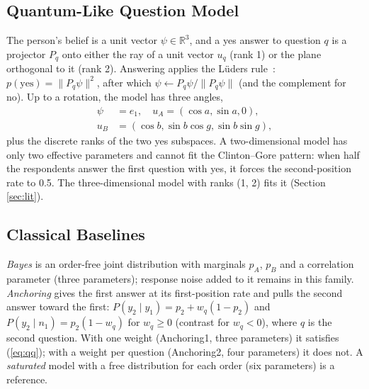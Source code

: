 \subsection{Quantum-Like Question Model}\label{sec:ql}
The person's belief is a unit vector $\psi\in\mathbb{R}^3$, and a yes answer to question $q$ is a projector $P_q$ onto either the ray of a unit vector $u_q$ (rank 1) or the plane orthogonal to it (rank 2). Answering applies the L\"uders rule~\cite{Busemeyer2012}: $p(\text{yes})=\|P_q\psi\|^2$, after which $\psi\leftarrow P_q\psi/\|P_q\psi\|$ (and the complement for no). Up to a rotation, the model has three angles,
\begin{equation}
\begin{aligned}
\psi&=e_1,\quad u_A=(\cos a,\sin a,0),\\
u_B&=(\cos b,\sin b\cos g,\sin b\sin g),
\end{aligned}
\end{equation}
plus the discrete ranks of the two yes subspaces. A two-dimensional model has only two effective parameters and cannot fit the Clinton--Gore pattern: when half the respondents answer the first question with yes, it forces the second-position rate to 0.5. The three-dimensional model with ranks (1, 2) fits it (Section \ref{sec:lit}).

\subsection{Classical Baselines}\label{sec:classical}
\textit{Bayes} is an order-free joint distribution with marginals $p_A$, $p_B$ and a correlation parameter (three parameters); response noise added to it remains in this family. \textit{Anchoring} gives the first answer at its first-position rate and pulls the second answer toward the first: $P(y_2\mid y_1)=p_2+w_q(1-p_2)$ and $P(y_2\mid n_1)=p_2(1-w_q)$ for $w_q\ge 0$ (contrast for $w_q<0$), where $q$ is the second question. With one weight (Anchoring1, three parameters) it satisfies (\ref{eq:qq}); with a weight per question (Anchoring2, four parameters) it does not. A \textit{saturated} model with a free distribution for each order (six parameters) is a reference.

